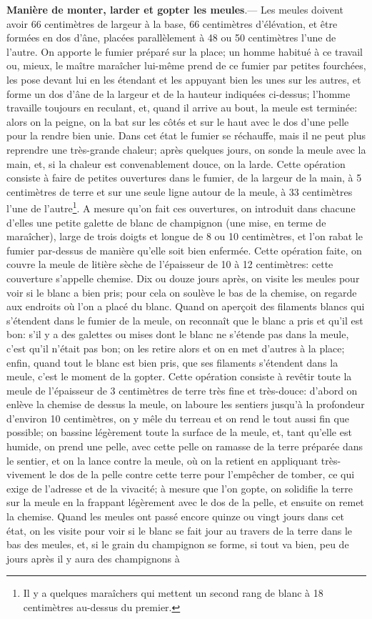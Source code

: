 \documentclass[10pt,a4paper]{book}
\begin{document}
\textbf{Manière de monter, larder et gopter les meules}.--- Les meules doivent avoir 66 centimètres de largeur à la base, 66 centimètres d'élévation, et être formées en dos d'âne, placées parallèlement à 48 ou 50 centimètres l'une de l'autre. On apporte le fumier préparé sur la place; un homme habitué à ce travail ou, mieux, le maître maraîcher lui-même prend de ce fumier par petites fourchées, les pose devant lui en les étendant et les appuyant bien les unes sur les autres, et forme un dos d'âne de la largeur et de la hauteur indiquées ci-dessus; l'homme travaille toujours en reculant, et, quand il arrive au bout, la meule est terminée: alors on la peigne, on la bat sur les côtés et sur le haut avec le dos d'une pelle pour la rendre bien unie. Dans cet état le fumier se réchauffe, mais il ne peut plus reprendre une très-grande chaleur; après quelques jours, on sonde la meule avec la main, et, si la chaleur est convenablement douce, on la larde. Cette opération consiste à faire de petites ouvertures dans le fumier, de la largeur de la main, à 5 centimètres de terre et sur une seule ligne autour de la meule, à 33 centimètres l'une de l'autre\footnote{Il y a quelques maraîchers qui mettent un second rang de blanc à 18 centimètres au-dessus du premier.}. A mesure qu'on fait ces ouvertures, on introduit dans chacune d'elles une petite galette de blanc de champignon (une mise, en terme de maraîcher), large de trois doigts et longue de 8 ou 10 centimètres, et l'on rabat le fumier par-dessus de manière qu'elle soit bien enfermée. Cette opération faite, on couvre la meule de litière sèche de l'épaisseur de 10 à 12 centimètres: cette couverture s'appelle chemise. Dix ou douze jours après, on visite les meules pour voir si le blanc a bien pris; pour cela on soulève le bas de la chemise, on regarde aux endroits où l'on a placé du blanc. Quand on aperçoit des filaments blancs qui s'étendent dans le fumier de la meule, on reconnaît que le blanc a pris et qu'il est bon: s'il y a des galettes ou mises dont le blanc ne s'étende pas dans la meule, c'est qu'il n'était pas bon; on les retire alors et on en met d'autres à la place; enfin, quand tout le blanc est bien pris, que ses filaments s'étendent dans la meule, c'est le moment de la gopter. Cette opération consiste à revêtir toute la meule de l'épaisseur de 3 centimètres de terre très fine et très-douce: d'abord on enlève la chemise de dessus la meule, on laboure les sentiers jusqu'à la profondeur d'environ 10 centimètres, on y mêle du terreau et on rend le tout aussi fin que possible; on bassine légèrement toute la surface de la meule, et, tant qu'elle est humide, on prend une pelle, avec cette pelle on ramasse de la terre préparée dans le sentier, et on la lance contre la meule, où on la retient en appliquant très-vivement le dos de la pelle contre cette terre pour l'empêcher de tomber, ce qui exige de l'adresse et de la vivacité; à mesure que l'on gopte, on solidifie la terre sur la meule en la frappant légèrement avec le dos de la pelle, et ensuite on remet la chemise. Quand les meules ont passé encore quinze ou vingt jours dans cet état, on les visite pour voir si le blanc se fait jour au travers de la terre dans le bas des meules, et, si le grain du champignon se forme, si tout va bien, peu de jours après il y aura des champignons à 
\end{document}

